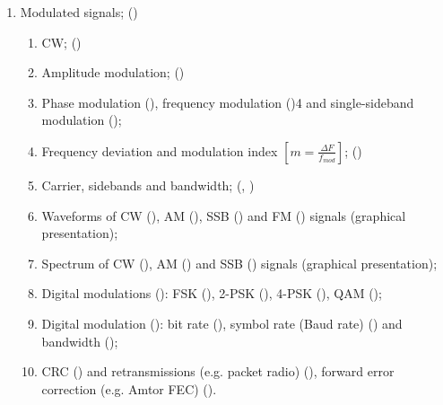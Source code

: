 \begin{flushleft}
\begin{enumerate}
\begin{enumerate}
\item Modulated signals; ()\label{HAREC.a.1.8}
\begin{enumerate}
\item CW; ()\label{HAREC.a.1.8.1}
\item Amplitude modulation; ()\label{HAREC.a.1.8.2}
\item Phase modulation ()\label{HAREC.a.1.8.3a},
  frequency modulation ()\label{HAREC.a.1.8.3b}4
  and single-sideband modulation ()\label{HAREC.a.1.8.3c};
\item Frequency deviation and modulation index
  \(\left[m = \frac{\Delta F}{f_{mod}}\right]\);
  ()\label{HAREC.a.1.8.4}
\item Carrier, sidebands and bandwidth;
  (, )\label{HAREC.a.1.8.5}
\item Waveforms of CW ()\label{HAREC.a.1.8.6a},
  AM ()\label{HAREC.a.1.8.6b},
  SSB ()\label{HAREC.a.1.8.6c}
  and FM ()\label{HAREC.a.1.8.6d}
  signals (graphical presentation);
\item Spectrum of CW ()\label{HAREC.a.1.8.7a},
  AM ()\label{HAREC.a.1.8.7b}
  and SSB ()\label{HAREC.a.1.8.7c}
  signals (graphical presentation);
\item Digital modulations ()\label{HAREC.a.1.8.8}:
  FSK ()\label{HAREC.a.1.8.8a},
  2-PSK ()\label{HAREC.a.1.8.8b},
  4-PSK ()\label{HAREC.a.1.8.8c},
  QAM ()\label{HAREC.a.1.8.8d};
\item Digital modulation ()\label{HAREC.a.1.8.9}:
  bit rate ()\label{HAREC.a.1.8.9a},
  symbol rate (Baud rate) ()\label{HAREC.a.1.8.9b}
  and bandwidth ()\label{HAREC.a.1.8.9c};
\item CRC ()\label{HAREC.a.1.8.10a}
  and retransmissions (e.g. packet radio)
  ()\label{HAREC.a.1.8.10b},
  forward error correction (e.g. Amtor FEC)
  ()\label{HAREC.a.1.8.10c}.
\end{enumerate}


\end{enumerate}
\end{enumerate}
\end{flushleft}
